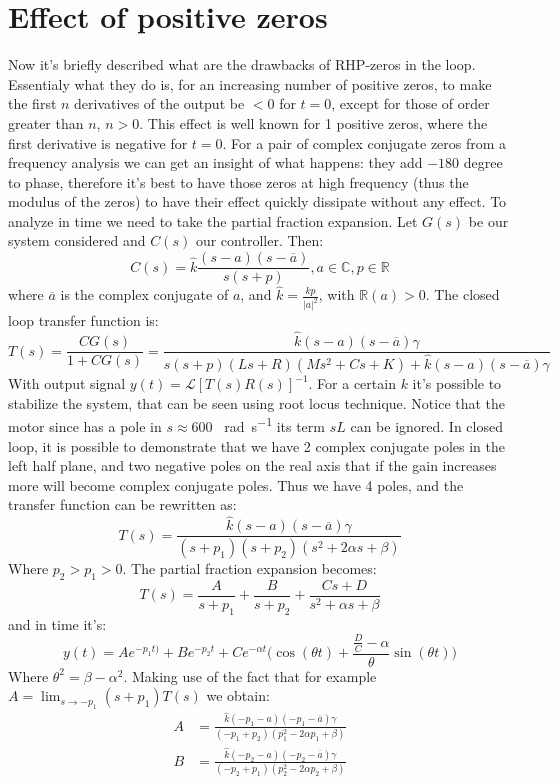 \section{Effect of positive zeros}
Now it's briefly described what are the drawbacks of RHP-zeros in the loop. Essentialy what they do is, for an increasing number of positive zeros, to make the first $n$ derivatives of the output be $<0$ for $t=0$, except for those of order greater than $n$, $n>0$. This effect is well known for 1 positive zeros, where the first derivative is negative for $t=0$. For a pair of complex conjugate zeros from  a frequency analysis we can get an insight of what happens: they add  $-180$ degree to phase, therefore it's best to have those zeros at high frequency (thus the modulus of the zeros) to have their effect quickly dissipate without any effect. To analyze in time we need to take the partial 	fraction expansion. Let $G(s)$ be our system considered and $C(s)$ our controller. Then:
$$C(s) = \hat{k}\frac{(s-a)(s-\overline{a})}{s(s+p)}, a \in \mathbb{C}, p \in \mathbb{R}$$
where $\overline{a}$ is the complex conjugate of $a$, and $\hat{k}=\frac{kp}{|a|^2}$, with $\mathbb{R}(a) > 0$. 
The closed loop transfer function is:
$$T(s) = \frac{CG(s)}{1+CG(s)} = \frac{\hat{k}(s-a)(s-\overline{a})\gamma}{s(s+p)(Ls+R)(Ms^2+Cs+K)+\hat{k}(s-a)(s-\overline{a})\gamma}$$
With output signal $y(t) = \mathcal{L}[T(s)R(s)]^{-1}$.
For a certain $k$ it's possible to stabilize the system, that can be seen using root locus technique.
Notice that the motor since has a pole in $s \approx 600$ \SI{}{\radian \per \second} its term $sL$ can be ignored. In closed loop, it is possible to demonstrate that we have 2 complex conjugate poles in the left half plane, and two negative poles on the real axis that if the gain increases more will become complex conjugate poles. Thus we have 4 poles, and the transfer function can be rewritten as:
$$T(s) = \frac{\hat{k}(s-a)(s-\overline{a})\gamma}{(s+p_{1})(s+p_{2})(s^2+2\alpha s+\beta)}
$$
Where $p_2>p_1 >0 $. The partial fraction expansion becomes:
$$T(s) = \frac{A}{s+p_1} + \frac{B}{s+p_2} +\frac{Cs+D}{s^2+\alpha s+\beta}$$
and in time it's:
$$y(t) = Ae^{-p_1 t)}+ Be^{-p_2 t} +Ce^{-\alpha t}\Big (\cos(\theta t)+ \frac{\frac{D}{C}-\alpha}{\theta} \sin(\theta t) \Big)$$
Where $\theta^2 =  \beta -\alpha^2$. 
Making use of the fact that for example $A = \lim_{s \to -p_1} (s+p_1)T(s)$ we obtain:
\begin{align*}A &= \frac{\hat{k}(-p_1-a)(-p_1-\overline{a})\gamma}{(-p_1+p_2)(p_1^2-2\alpha p_1+\beta)}\\
B &= \frac{\hat{k}(-p_2-a)(-p_2-\overline{a})\gamma}{(-p_2+p_1)(p_2^2-2\alpha p_2+\beta)}
\end{align*}
